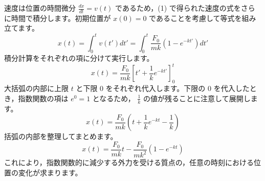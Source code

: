 \begin{solutionparts}
速度は位置の時間微分 $\frac{dx}{dt} = v(t)$ であるため，(1) で得られた速度の式をさらに時間で積分します。初期位置が $x(0) = 0$ であることを考慮して等式を組み立てます。
\begin{equation*}
x(t) = \int_0^t v(t') dt' = \int_0^t \frac{F_0}{mk} \left( 1 - e^{-kt'} \right) dt'
\end{equation*}
積分計算をそれぞれの項に分けて実行します。
\begin{equation*}
x(t) = \frac{F_0}{mk} \left[ t' + \frac{1}{k} e^{-kt'} \right]_0^t
\end{equation*}
大括弧の内部に上限 $t$ と下限 0 をそれぞれ代入します。下限の 0 を代入したとき，指数関数の項は $e^0 = 1$ となるため， $\frac{1}{k}$ の値が残ることに注意して展開します。
\begin{equation*}
x(t) = \frac{F_0}{mk} \left( t + \frac{1}{k} e^{-kt} - \frac{1}{k} \right)
\end{equation*}
括弧の内部を整理してまとめます。
\begin{equation*}
x(t) = \frac{F_0}{mk} t - \frac{F_0}{mk^2} \left( 1 - e^{-kt} \right)
\end{equation*}
これにより，指数関数的に減少する外力を受ける質点の，任意の時刻における位置の変化が求まります。

\end{solutionparts}
